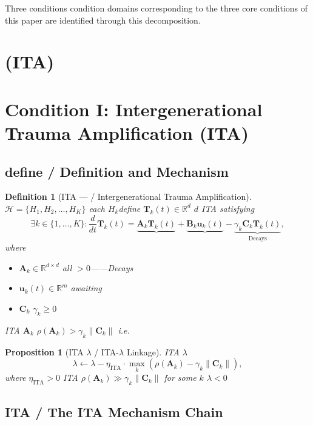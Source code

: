 \documentclass[11pt,a4paper]{article}
\newtheorem{proposition}[theorem]{Proposition}
\newtheorem{definition}[theorem]{Definition}
\theoremstyle{remark}
\newcommand{\R}{\mathbb{R}}
\newcommand{\paren}[1]{\left(#1\right)}
\newcommand{\lambdaparam}{\lambda}
\begin{document}
Three conditions condition domains corresponding to the three core conditions
of this paper are identified through this decomposition.

\section{ (ITA)}
\section{Condition I: Intergenerational Trauma Amplification (ITA)}

\subsection{define / Definition and Mechanism}

\begin{definition}[ITA —  / Intergenerational Trauma Amplification]
\label{def:ITA}
 $\mathcal{H} = \{H_1, H_2, \ldots, H_K\}$ 
each $H_k$define\textbf{} $\mathbf{T}_k(t) \in \R^d$
 $d$ 
ITA satisfying
\[
\exists k \in \{1,\ldots,K\} : \frac{d}{dt} \mathbf{T}_k(t) = 
\underbrace{\mathbf{A}_k \mathbf{T}_k(t)}_{\text{}} + 
\underbrace{\mathbf{B}_k \mathbf{u}_k(t)}_{\text{}} - 
\underbrace{\gamma_k \mathbf{C}_k \mathbf{T}_k(t)}_{\text{Decays}},
\]
where
\begin{itemize}
    \item $\mathbf{A}_k \in \R^{d \times d}$ all $>0$——Decays
    \item $\mathbf{u}_k(t) \in \R^m$ awaiting
    \item $\mathbf{C}_k$ $\gamma_k \geq 0$ 
\end{itemize}
ITA  $\mathbf{A}_k$  $\rho(\mathbf{A}_k) > \gamma_k \|\mathbf{C}_k\|$
i.e.
\end{definition}

\begin{proposition}[ITA  $\lambdaparam$  / ITA-$\lambdaparam$ Linkage]
\label{prop:ITA_lambda}
 ITA $\lambdaparam$ 
\[
\lambdaparam \leftarrow \lambdaparam - \eta_{\text{ITA}} \cdot 
\max_{k} \paren{\rho(\mathbf{A}_k) - \gamma_k \|\mathbf{C}_k\|},
\]
where $\eta_{\text{ITA}} > 0$  ITA 
$\rho(\mathbf{A}_k) \gg \gamma_k \|\mathbf{C}_k\|$ for some $k$
 $\lambdaparam < 0$
\end{proposition}

\subsection{ITA  / The ITA Mechanism Chain}
\end{document}
